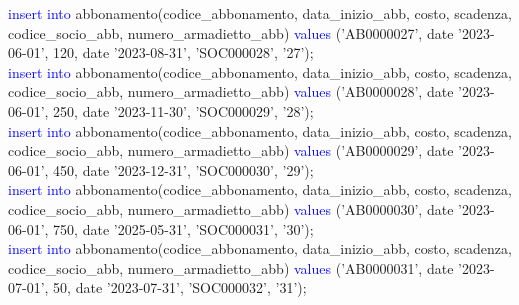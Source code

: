 \documentclass{article}
\begin{document}
\begin{flushleft}
{        \hspace*{0.5em}\textcolor{blue}{insert into} abbonamento(codice\_abbonamento, data\_inizio\_abb, costo, scadenza, \hspace*{0.5em}codice\_socio\_abb, numero\_armadietto\_abb) \textcolor{blue}{values} ('AB0000027', date '2023-06-01', \hspace*{0.5em}120, date '2023-08-31', 'SOC000028', '27'); \\
        \vspace{2mm}
        \hspace*{0.5em}\textcolor{blue}{insert into} abbonamento(codice\_abbonamento, data\_inizio\_abb, costo, scadenza, \hspace*{0.5em}codice\_socio\_abb, numero\_armadietto\_abb) \textcolor{blue}{values} ('AB0000028', date '2023-06-01', \hspace*{0.5em}250, date '2023-11-30', 'SOC000029', '28'); \\
        \vspace{2mm}
        \hspace*{0.5em}\textcolor{blue}{insert into} abbonamento(codice\_abbonamento, data\_inizio\_abb, costo, scadenza, \hspace*{0.5em}codice\_socio\_abb, numero\_armadietto\_abb) \textcolor{blue}{values} ('AB0000029', date '2023-06-01', \hspace*{0.5em}450, date '2023-12-31', 'SOC000030', '29'); \\
        \vspace{2mm}
        \hspace*{0.5em}\textcolor{blue}{insert into} abbonamento(codice\_abbonamento, data\_inizio\_abb, costo, scadenza, \hspace*{0.5em}codice\_socio\_abb, numero\_armadietto\_abb) \textcolor{blue}{values} ('AB0000030', date '2023-06-01', \hspace*{0.5em}750, date '2025-05-31', 'SOC000031', '30'); \\
        \vspace{2mm}
        \hspace*{0.5em}\textcolor{blue}{insert into} abbonamento(codice\_abbonamento, data\_inizio\_abb, costo, scadenza, \hspace*{0.5em}codice\_socio\_abb, numero\_armadietto\_abb) \textcolor{blue}{values} ('AB0000031', date '2023-07-01', \hspace*{0.5em}50, date '2023-07-31', 'SOC000032', '31'); \\
        \vspace{2mm}
}
\end{flushleft}
\end{document}
